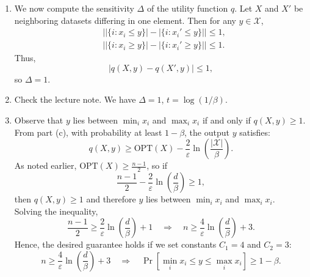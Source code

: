 \documentclass[12pt]{article}
\begin{document}
\begin{enumerate}
\begin{solution}
\begin{enumerate}
    \item[(b)] We now compute the sensitivity $\Delta$ of the utility function $q$. Let $X$ and $X'$ be neighboring datasets differing in one element. Then for any $y \in \mathcal{X}$,
    \begin{align*}
        & \left| |\{i : x_i \le y\}| - |\{i : x_i' \le y\}| \right| \le 1, \\
        & \left| |\{i : x_i \ge y\}| - |\{i : x_i' \ge y\}| \right| \le 1.
    \end{align*}
    Thus,
    \[
    |q(X, y) - q(X', y)| \le 1,
    \]
    so $\Delta = 1$.
    
    \item[(c)] Check the lecture note. We have $\Delta = 1$, $t = \log(1/\beta)$.

    \item[(d)] Observe that $y$ lies between $\min_i x_i$ and $\max_i x_i$ if and only if $q(X, y) \geq 1$. From part (c), with probability at least $1 - \beta$, the output $y$ satisfies:
    \[
    q(X, y) \geq \text{OPT}(X) - \frac{2}{\varepsilon} \ln\left( \frac{|\mathcal{X}|}{\beta} \right).
    \]
    As noted earlier, $\text{OPT}(X) \geq \frac{n - 1}{2}$, so if
    \[
    \frac{n - 1}{2} - \frac{2}{\varepsilon} \ln\left( \frac{d}{\beta} \right) \geq 1,
    \]
    then $q(X, y) \geq 1$ and therefore $y$ lies between $\min_i x_i$ and $\max_i x_i$.\\
    Solving the inequality,
    \[
    \frac{n - 1}{2} \geq \frac{2}{\varepsilon} \ln\left( \frac{d}{\beta} \right) + 1
    \quad \Rightarrow \quad
    n \geq \frac{4}{\varepsilon} \ln\left( \frac{d}{\beta} \right) + 3.
    \]
    Hence, the desired guarantee holds if we set constants $C_1 = 4$ and $C_2 = 3$:
    \[
    n \geq \frac{4}{\varepsilon} \ln\left( \frac{d}{\beta} \right) + 3
    \quad \Rightarrow \quad
    \Pr\left[ \min_i x_i \leq y \leq \max_i x_i \right] \geq 1 - \beta.
    \]

    
\end{enumerate}

\end{solution}

\end{enumerate}
\end{document}
